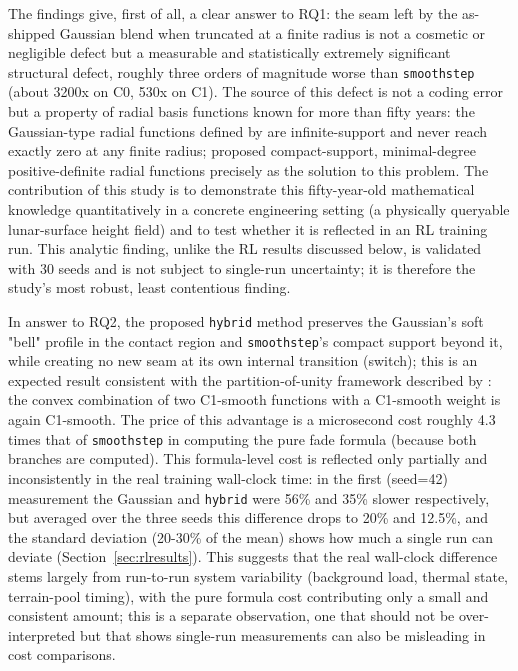 The findings give, first of all, a clear answer to RQ1: the seam left by the as-shipped Gaussian blend when truncated at a finite radius is not a cosmetic or negligible defect but a measurable and statistically extremely significant structural defect, roughly three orders of magnitude worse than \texttt{smoothstep} (about 3200x on C0, 530x on C1). The source of this defect is not a coding error but a property of radial basis functions known for more than fifty years: the Gaussian-type radial functions defined by \citet{hardy1971} are infinite-support and never reach exactly zero at any finite radius; \citet{wendland1995} proposed compact-support, minimal-degree positive-definite radial functions precisely as the solution to this problem. The contribution of this study is to demonstrate this fifty-year-old mathematical knowledge quantitatively in a concrete engineering setting (a physically queryable lunar-surface height field) and to test whether it is reflected in an RL training run. This analytic finding, unlike the RL results discussed below, is validated with 30 seeds and is not subject to single-run uncertainty; it is therefore the study's most robust, least contentious finding.

In answer to RQ2, the proposed \texttt{hybrid} method preserves the Gaussian's soft "bell" profile in the contact region and \texttt{smoothstep}'s compact support beyond it, while creating no new seam at its own internal transition (switch); this is an expected result consistent with the partition-of-unity framework described by \citet{ohtake2003}: the convex combination of two C1-smooth functions with a C1-smooth weight is again C1-smooth. The price of this advantage is a microsecond cost roughly 4.3 times that of \texttt{smoothstep} in computing the pure fade formula (because both branches are computed). This formula-level cost is reflected only partially and inconsistently in the real training wall-clock time: in the first (seed=42) measurement the Gaussian and \texttt{hybrid} were 56\% and 35\% slower respectively, but averaged over the three seeds this difference drops to 20\% and 12.5\%, and the standard deviation (20-30\% of the mean) shows how much a single run can deviate (Section~\ref{sec:rlresults}). This suggests that the real wall-clock difference stems largely from run-to-run system variability (background load, thermal state, terrain-pool timing), with the pure formula cost contributing only a small and consistent amount; this is a separate observation, one that should not be over-interpreted but that shows single-run measurements can also be misleading in cost comparisons.

